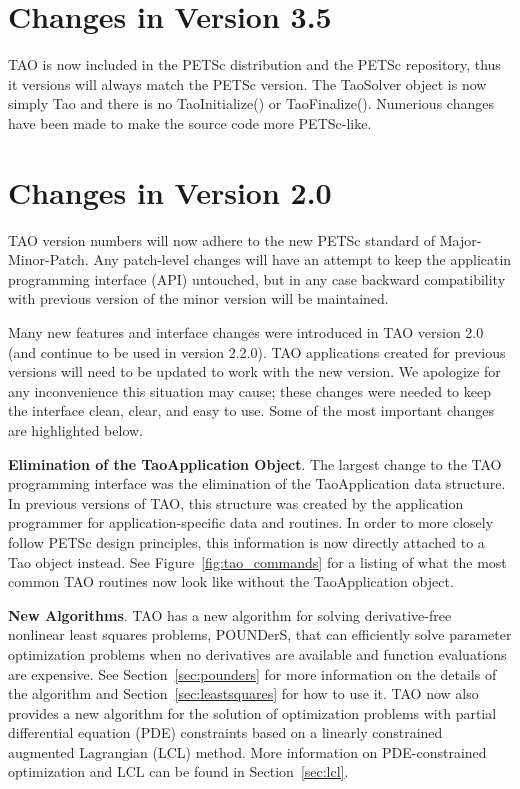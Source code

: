 
\section*{Changes in Version 3.5}
TAO is now included in the PETSc distribution and the PETSc
repository, thus it versions will always match the PETSc version. The
TaoSolver object is now simply Tao and there is no TaoInitialize() or
TaoFinalize(). Numerious changes have been made to make the source
code more PETSc-like.

\section*{Changes in Version 2.0}

TAO version numbers will now adhere to the new PETSc standard of 
Major-Minor-Patch. Any patch-level changes will have an attempt to keep the 
applicatin programming interface (API) untouched, but in any case backward 
compatibility with previous version of the minor version will be 
maintained.

Many new features and interface changes were introduced in TAO version 2.0 (and continue to be used in version 2.2.0).
TAO applications created for previous versions will need to be updated to 
work with the new version.  We apologize for any inconvenience this situation
may cause; these changes were needed to keep the interface
clean, 
clear, and easy to use. Some of the most important changes are highlighted 
below.

\vspace{7mm}
\noindent \textbf{Elimination of the TaoApplication Object}. The largest change to the TAO programming interface was the elimination of the
TaoApplication data structure. In previous versions of TAO, this structure was 
created by the application programmer for application-specific data and 
routines.  In order to more closely follow PETSc design principles, this 
information is now directly attached to a Tao object instead.  See 
Figure~\ref{fig:tao_commands} for a listing of what the most common TAO 
routines now look like without the TaoApplication object.

\vspace{7mm}
\noindent \textbf{New Algorithms}. TAO has a new algorithm for solving derivative-free nonlinear least
squares
problems, POUNDerS, that can efficiently solve parameter optimization problems 
when no derivatives are available and function evaluations are expensive. 
See 
Section~\ref{sec:pounders} for more information on the details of the 
algorithm and Section~\ref{sec:leastsquares} for how to use it.
TAO now also provides a new algorithm for the solution of optimization
problems with partial differential equation (PDE) constraints based on a
linearly constrained augmented Lagrangian (LCL) method.  More 
information on PDE-constrained optimization and LCL can be found 
in Section~\ref{sec:lcl}.


